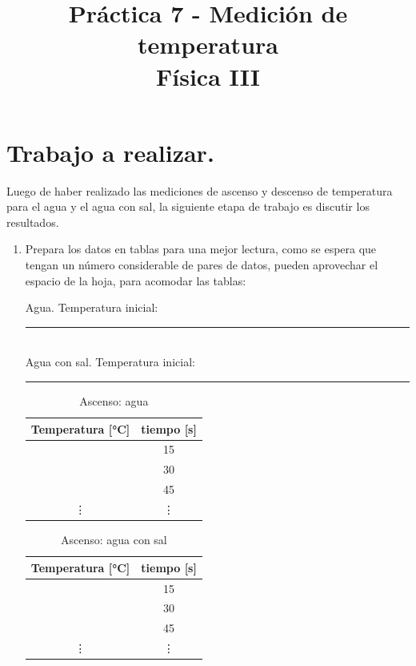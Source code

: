 \documentclass[14pt]{extarticle}
\title{\vspace*{-2cm} Práctica 7 - Medición de temperatura \\  Física III \vspace{-5ex}}
\date{}
\begin{document}
\maketitle
\renewcommand{\tablename}{Tabla}

\section{Trabajo a realizar.}

Luego de haber realizado las mediciones de ascenso y descenso de temperatura para el agua y el agua con sal, la siguiente etapa de trabajo es discutir los resultados.

\begin{enumerate}
\item  Prepara los datos en tablas para una mejor lectura, como se espera que tengan un número considerable de pares de datos, pueden aprovechar el espacio de la hoja, para acomodar las tablas:

\vspace*{1cm}
Agua. \hspace{0.5cm} Temperatura inicial: \rule{2cm}{0.1mm} \\[0.5em]
Agua con sal. \hspace{0.5cm} Temperatura inicial: \rule{2cm}{0.1mm}

\vspace*{0.25cm}
\begin{minipage}[t]{0.45\linewidth}
\begin{table}[H]
\centering
\caption{Ascenso: agua}
\begin{tabular}{| c | c |} \hline
Temperatura [\si{\degreeCelsius}] & tiempo [\si{\second}] \\ \hline
 & \num{15} \\ \hline
 & \num{30} \\ \hline
 & \num{45} \\ \hline
\vdots & \vdots \\ \hline
\end{tabular}
\end{table}
\end{minipage}
\begin{minipage}[t]{0.45\linewidth}
\begin{table}[H]
\centering
\caption{Ascenso: agua con sal}
\begin{tabular}{| c | c |} \hline
Temperatura [\si{\degreeCelsius}] & tiempo [\si{\second}] \\ \hline
    & \num{15} \\ \hline
    & \num{30} \\ \hline
    & \num{45} \\ \hline
\vdots & \vdots \\ \hline
\end{tabular}
\end{table}
\end{minipage}


\end{enumerate}
\end{document}
